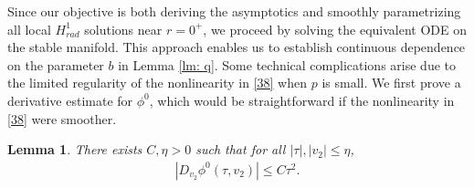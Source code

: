 \documentclass[12pt]{amsart}
\newtheorem{lemma}[theorem]{Lemma}
\begin{document}
Since our objective is both deriving the asymptotics and smoothly parametrizing all local $H_{rad}^1$ solutions near $r=0^+$, we proceed by solving the equivalent ODE on the stable manifold. This approach enables us to establish continuous dependence on the parameter $b$ in Lemma \ref{lm: q}. Some technical complications arise due to the limited regularity of the nonlinearity in \eqref{38} when $p$ is small. 
We first prove a derivative estimate for $\phi^0$, which would be straightforward if the nonlinearity in \eqref{38} were smoother. 

\begin{lemma}\label{lm: dv2} 
There exists $C, \eta>0$ such that for all $|\tau|, |v_2|\le \eta$, 
\begin{align}\label{40.1}
|D_{v_2} \phi^0(\tau, v_2)|\le C\tau^2. 
\end{align}
\end{lemma}
\end{document}
